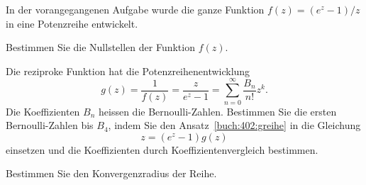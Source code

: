 In der vorangegangenen Aufgabe wurde die ganze Funktion $f(z)=(e^z-1)/z$
in eine Potenzreihe entwickelt.
\begin{teilaufgaben}
\item Bestimmen Sie die Nullstellen der Funktion $f(z)$.
\item Die reziproke Funktion hat die Potenzreihenentwicklung
\begin{equation}
g(z)
=
\frac{1}{f(z)}
=
\frac{z}{e^z-1}
=
\sum_{n=0}^\infty \frac{B_n}{n!}z^k.
\label{buch:402:greihe}
\end{equation}
Die Koeffizienten $B_n$ heissen die Bernoulli-Zahlen.
Bestimmen Sie die ersten Bernoulli-Zahlen bis $B_4$, indem 
Sie den Ansatz~\eqref{buch:402:greihe}
in die Gleichung
\[
z = (e^z-1) g(z)
\]
einsetzen und die Koeffizienten durch Koeffizientenvergleich
bestimmen.
\item
Bestimmen Sie den Konvergenzradius der Reihe.
\end{teilaufgaben}

